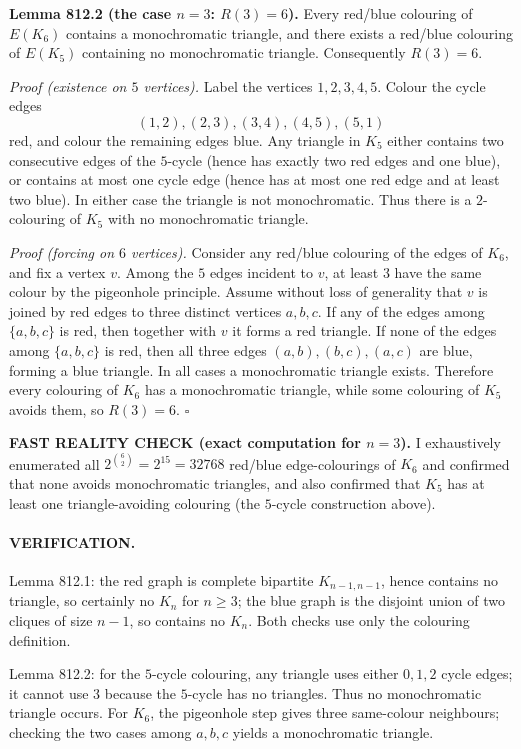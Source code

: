 \textbf{Lemma 812.2 (the case $n=3$: $R(3)=6$).}
Every red/blue colouring of $E(K_6)$ contains a monochromatic triangle, and there exists a red/blue colouring of $E(K_5)$ containing no monochromatic triangle. Consequently $R(3)=6$.

\emph{Proof (existence on $5$ vertices).}
Label the vertices $1,2,3,4,5$. Colour the cycle edges
\[(1,2),(2,3),(3,4),(4,5),(5,1)
\]
red, and colour the remaining edges blue.
Any triangle in $K_5$ either contains two consecutive edges of the $5$-cycle (hence has exactly two red edges and one blue), or contains at most one cycle edge (hence has at most one red edge and at least two blue). In either case the triangle is not monochromatic.
Thus there is a $2$-colouring of $K_5$ with no monochromatic triangle.

\emph{Proof (forcing on $6$ vertices).}
Consider any red/blue colouring of the edges of $K_6$, and fix a vertex $v$.
Among the $5$ edges incident to $v$, at least $3$ have the same colour by the pigeonhole principle.
Assume without loss of generality that $v$ is joined by red edges to three distinct vertices $a,b,c$.
If any of the edges among $\{a,b,c\}$ is red, then together with $v$ it forms a red triangle.
If none of the edges among $\{a,b,c\}$ is red, then all three edges $(a,b),(b,c),(a,c)$ are blue, forming a blue triangle.
In all cases a monochromatic triangle exists.
Therefore every colouring of $K_6$ has a monochromatic triangle, while some colouring of $K_5$ avoids them, so $R(3)=6$.
\hfill $\square$

\textbf{FAST REALITY CHECK (exact computation for $n=3$).}
I exhaustively enumerated all $2^{\binom{6}{2}}=2^{15}=32768$ red/blue edge-colourings of $K_6$ and confirmed that none avoids monochromatic triangles, and also confirmed that $K_5$ has at least one triangle-avoiding colouring (the $5$-cycle construction above).

\paragraph{VERIFICATION.}
Lemma 812.1: the red graph is complete bipartite $K_{n-1,n-1}$, hence contains no triangle, so certainly no $K_n$ for $n\ge3$; the blue graph is the disjoint union of two cliques of size $n-1$, so contains no $K_n$. Both checks use only the colouring definition.

Lemma 812.2: for the $5$-cycle colouring, any triangle uses either $0,1,2$ cycle edges; it cannot use $3$ because the $5$-cycle has no triangles. Thus no monochromatic triangle occurs. For $K_6$, the pigeonhole step gives three same-colour neighbours; checking the two cases among $a,b,c$ yields a monochromatic triangle.

